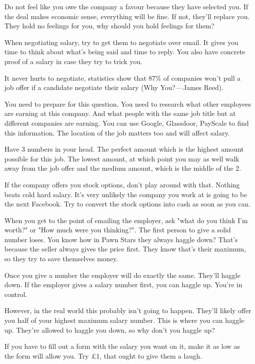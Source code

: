 \documentclass{article}
\begin{document}
Do not feel like you owe the company a favour because they have selected
you. If the deal makes economic sense, everything will be fine. If not,
they'll replace you. They hold no feelings for you, why should you hold
feelings for them?

When negotiating salary, try to get them to negotiate over email. It
gives you time to think about what's being said and time to reply. You
also have concrete proof of a salary in case they try to trick you.

It never hurts to negotiate, statistics show that 87\% of companies
won't pull a job offer if a candidate negotiate their salary (Why
You? --- James Reed).

You need to prepare for this question. You need to research what other
employees are earning at this company. And what people with the same job
title but at different companies are earning. You can use Google,
Glassdoor, PayScale to find this information. The location of the job
matters too and will affect salary.

Have 3 numbers in your head. The perfect amount which is the highest
amount possible for this job. The lowest amount, at which point you may
as well walk away from the job offer and the medium amount, which is the
middle of the 2.

If the company offers you stock options, don't play around with that.
Nothing beats cold hard salary. It's very unlikely the company you work
at is going to be the next Facebook. Try to convert the stock options
into cash as soon as you can.

When you get to the point of emailing the employer, ask "what do you
think I'm worth?" or "How much were you thinking?". The first person
to give a solid number loses. You know how in Pawn Stars they always
haggle down? That's because the seller always gives the price first.
They know that's their maximum, so they try to save themselves money.

Once you give a number the employer will do exactly the same. They'll
haggle down. If the employer gives a salary number first, you can haggle
up. You're in control.

However, in the real world this probably isn't going to happen. They'll
likely offer you half of your highest maximum salary number. This is
where you can haggle up. They're allowed to haggle you down, so why
don't you haggle up?

If you have to fill out a form with the salary you want on it, make it
as low as the form will allow you. Try £1, that ought to give them a
laugh.
\end{document}
